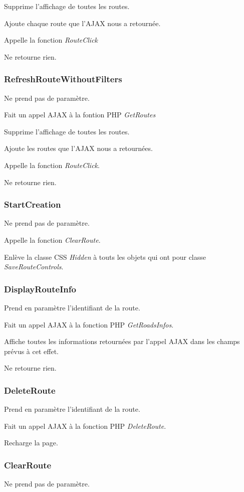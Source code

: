 \documentclass[a4paper]{article}
\begin{document}
Supprime l'affichage de toutes les routes. 

Ajoute chaque route que l'AJAX nous a retournée.

Appelle la fonction \emph{RouteClick}

Ne retourne rien.

\subsubsection{RefreshRouteWithoutFilters}
Ne prend pas de paramètre.

Fait un appel AJAX à la fontion PHP \emph{GetRoutes}

Supprime l'affichage de toutes les routes.

Ajoute les routes que l'AJAX nous a retournées.

Appelle la fonction \emph{RouteClick}.

Ne retourne rien.

\subsubsection{StartCreation}
Ne prend pas de paramètre.

Appelle la fonction \emph{ClearRoute}.

Enlève la classe CSS \emph{Hidden} à touts les objets qui ont pour classe \emph{SaveRouteControls}.


\subsubsection{DisplayRouteInfo}
Prend en paramètre l'identifiant de la route.

Fait un appel AJAX à la fonction PHP \emph{GetRoadsInfos}.

Affiche toutes les informations retournées par l'appel AJAX dans les champs prévus à cet effet.

Ne retourne rien.

\subsubsection{DeleteRoute}
Prend en paramètre l'identifiant de la route.

Fait un appel AJAX à la fonction PHP \emph{DeleteRoute}.

Recharge la page.


\subsubsection{ClearRoute}
Ne prend pas de paramètre.
\end{document}

